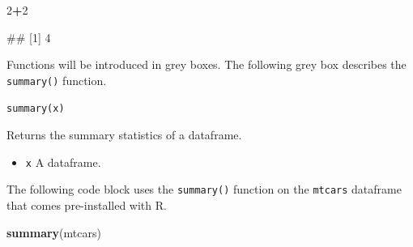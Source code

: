 \documentclass[
]{book}
\newenvironment{Shaded}{\begin{snugshade}}{\end{snugshade}}
\newcommand{\DecValTok}[1]{\textcolor[rgb]{0.00,0.00,0.81}{#1}}
\newcommand{\FunctionTok}[1]{\textcolor[rgb]{0.13,0.29,0.53}{\textbf{#1}}}
\newcommand{\NormalTok}[1]{#1}
\newcommand{\SpecialCharTok}[1]{\textcolor[rgb]{0.81,0.36,0.00}{\textbf{#1}}}
\providecommand{\tightlist}{%
  \setlength{\itemsep}{0pt}\setlength{\parskip}{0pt}}
\begin{document}
\begin{Shaded}
\begin{Highlighting}[]
\DecValTok{2}\SpecialCharTok{+}\DecValTok{2}
\end{Highlighting}
\end{Shaded}

\begin{Shaded}
\begin{Highlighting}[]
\NormalTok{\#\# [1] 4}
\end{Highlighting}
\end{Shaded}

Functions will be introduced in grey boxes. The following grey box describes the \texttt{summary()} function.

\texttt{summary(x)}

Returns the summary statistics of a dataframe.

\begin{itemize}
\tightlist
\item
  \texttt{x} A dataframe.
\end{itemize}

\hfill\break
\hfill\break
The following code block uses the \texttt{summary()} function on the \texttt{mtcars} dataframe that comes pre-installed with R.

\begin{Shaded}
\begin{Highlighting}[]
\FunctionTok{summary}\NormalTok{(mtcars)}
\end{Highlighting}
\end{Shaded}
\end{document}

